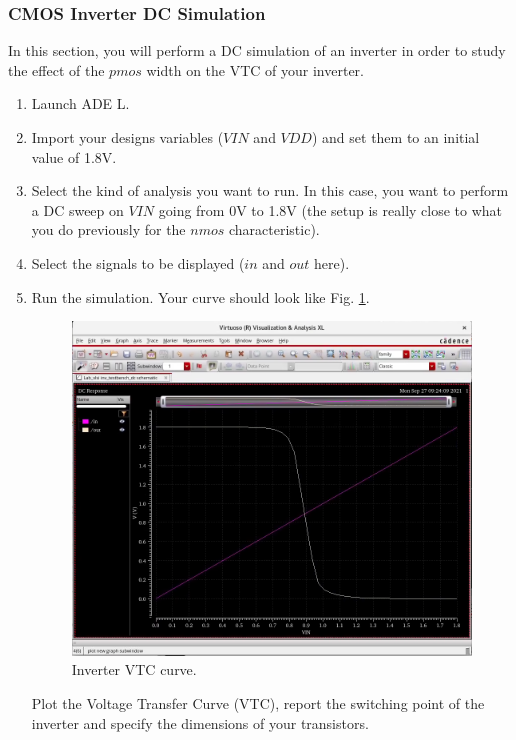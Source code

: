 \subsubsection{CMOS Inverter DC Simulation}	
In this section, you will perform a DC simulation of an inverter in order to study the effect of the $pmos$ width on the VTC of your inverter.

\begin{enumerate} 
	\item Launch ADE L.
	\item Import your designs variables ($VIN$ and $VDD$) and set them to an initial value of 1.8V.
	\item Select the kind of analysis you want to run. In this case, you want to perform a DC sweep on $VIN$ going from 0V to 1.8V (the setup is really close to what you do previously for the $nmos$ characteristic).
	\item Select the signals to be displayed ($in$ and $out$ here).
	\item Run the simulation. Your curve should look like Fig. \ref{fig_vtc}.
	\begin{figure}[!h]
		\centering
		\includegraphics[scale=0.35]{figures/lab1_schematic_sim/vtc_curve}
		\caption{Inverter VTC curve.}
		\label{fig_vtc}
	\end{figure}
	
	\begin{exercise} \label{ex3}
		Plot the Voltage Transfer Curve (VTC), report the switching point of the inverter and specify the dimensions of your transistors.
	\end{exercise}	
	

\end{enumerate}
